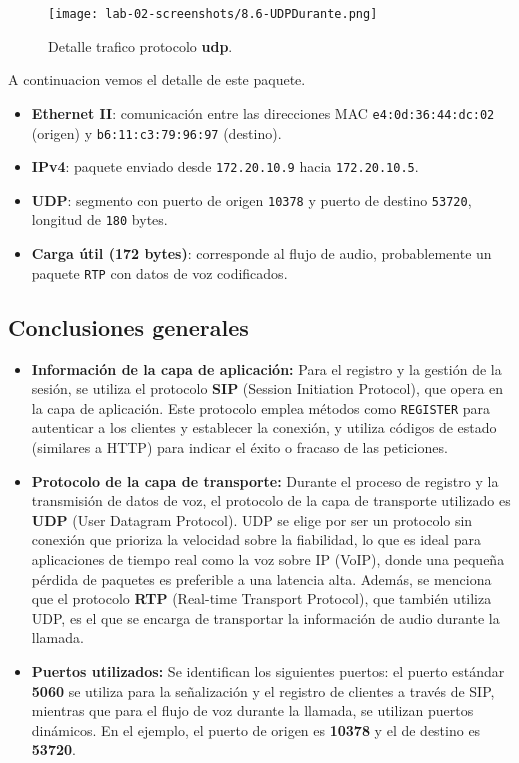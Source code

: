 \documentclass[10pt]{article}
\begin{document}
\begin{figure}[H]
    \centering
    \texttt{[image: lab-02-screenshots/8.6-UDPDurante.png]}
    \caption{Detalle trafico protocolo \textbf{udp}.}
\end{figure}
A continuacion vemos el detalle de este paquete.
\begin{itemize}
    \item \textbf{Ethernet II}: comunicación entre las direcciones MAC \texttt{e4:0d:36:44:dc:02} (origen) y \texttt{b6:11:c3:79:96:97} (destino).
    \item \textbf{IPv4}: paquete enviado desde \texttt{172.20.10.9} hacia \texttt{172.20.10.5}.
    \item \textbf{UDP}: segmento con puerto de origen \texttt{10378} y puerto de destino \texttt{53720}, longitud de \texttt{180} bytes.
    \item \textbf{Carga útil (172 bytes)}: corresponde al flujo de audio, probablemente un paquete \texttt{RTP} con datos de voz codificados.
\end{itemize}
\subsection*{Conclusiones generales}
\begin{itemize}
\item \textbf{Información de la capa de aplicación:} Para el registro y la gestión de la sesión, se utiliza el protocolo \textbf{SIP} (Session Initiation Protocol), que opera en la capa de aplicación. Este protocolo emplea métodos como \texttt{REGISTER} para autenticar a los clientes y establecer la conexión, y utiliza códigos de estado (similares a HTTP) para indicar el éxito o fracaso de las peticiones.
\item \textbf{Protocolo de la capa de transporte:} Durante el proceso de registro y la transmisión de datos de voz, el protocolo de la capa de transporte utilizado es \textbf{UDP} (User Datagram Protocol). UDP se elige por ser un protocolo sin conexión que prioriza la velocidad sobre la fiabilidad, lo que es ideal para aplicaciones de tiempo real como la voz sobre IP (VoIP), donde una pequeña pérdida de paquetes es preferible a una latencia alta. Además, se menciona que el protocolo \textbf{RTP} (Real-time Transport Protocol), que también utiliza UDP, es el que se encarga de transportar la información de audio durante la llamada.
\item \textbf{Puertos utilizados:} Se identifican los siguientes puertos: el puerto estándar \textbf{5060} se utiliza para la señalización y el registro de clientes a través de SIP, mientras que para el flujo de voz durante la llamada, se utilizan puertos dinámicos. En el ejemplo, el puerto de origen es \textbf{10378} y el de destino es \textbf{53720}.
\end{itemize}
\renewcommand{\thesection}{8.\arabic{section}}
\end{document}
